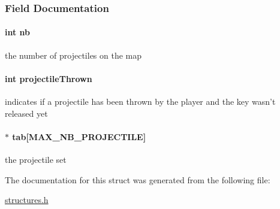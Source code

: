 \subsubsection{Field Documentation}
\hypertarget{structprojectile_set_ab310c6afcc676eab3930dce2650511c0}{
\paragraph[{nb}]{\setlength{\rightskip}{0pt plus 5cm}int nb}}\label{structprojectile_set_ab310c6afcc676eab3930dce2650511c0}
the number of projectiles on the map \hypertarget{structprojectile_set_accfd9d1d6194770a3368821b58ffc3b6}{
\paragraph[{projectile\-Thrown}]{\setlength{\rightskip}{0pt plus 5cm}int projectile\-Thrown}}\label{structprojectile_set_accfd9d1d6194770a3368821b58ffc3b6}
indicates if a projectile has been thrown by the player and the key wasn't released yet \hypertarget{structprojectile_set_ac4cbcd75bc678f0ad2b2d416ce87dc6d}{
\paragraph[{tab}]{$\ast$ tab\mbox{[}{\bf M\-A\-X\-\_\-\-N\-B\-\_\-\-P\-R\-O\-J\-E\-C\-T\-I\-L\-E}\mbox{]}}}\label{structprojectile_set_ac4cbcd75bc678f0ad2b2d416ce87dc6d}
the projectile set 

The documentation for this struct was generated from the following file\-:\begin{DoxyCompactItemize}
\item 
\hyperlink{structures_8h}{structures.\-h}\end{DoxyCompactItemize}
